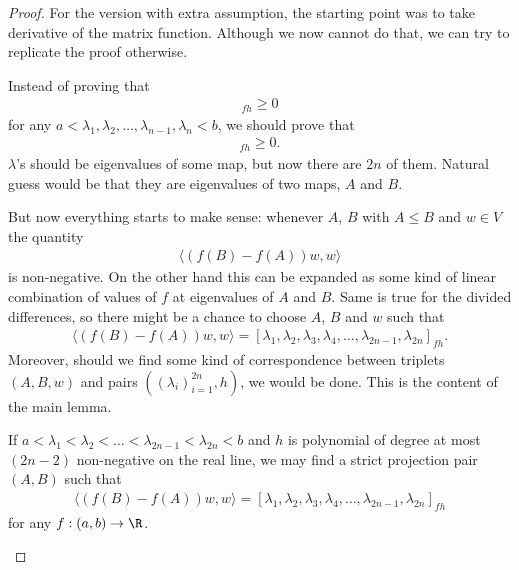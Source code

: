 \begin{proof}
	For the version with extra assumption, the starting point was to take derivative of the matrix function. Although we now cannot do that, we can try to replicate the proof otherwise.

	Instead of proving that
	\begin{align*}
		[\lambda_{1}, \lambda_{1}, \lambda_{2}, \lambda_{2}, \ldots, \lambda_{n}, \lambda_{n}]_{f h} \geq 0
	\end{align*}
	for any $a < \lambda_{1}, \lambda_{2}, \ldots, \lambda_{n - 1}, \lambda_{n} < b$, we should prove that
	\begin{align*}
		[\lambda_{1}, \lambda_{2}, \lambda_{3}, \lambda_{4}, \ldots, \lambda_{2n - 1}, \lambda_{2 n}]_{f h} \geq 0.
	\end{align*}
	$\lambda$'s should be eigenvalues of some map, but now there are $2 n$ of them. Natural guess would be that they are eigenvalues of two maps, $A$ and $B$.

	But now everything starts to make sense: whenever $A$, $B$ with $A \leq B$ and $w \in V$ the quantity
	\begin{align*}
		\langle (f(B) - f(A)) w, w \rangle
	\end{align*}
	is non-negative. On the other hand this can be expanded as some kind of linear combination of values of $f$ at eigenvalues of $A$ and $B$. Same is true for the divided differences, so there might be a chance to choose $A$, $B$ and $w$ such that
	\begin{align*}
		\langle (f(B) - f(A)) w, w \rangle = [\lambda_{1}, \lambda_{2}, \lambda_{3}, \lambda_{4}, \ldots, \lambda_{2n - 1}, \lambda_{2 n}]_{f h}.
	\end{align*}
	Moreover, should we find some kind of correspondence between triplets $(A, B, w)$ and pairs $((\lambda_{i})_{i = 1}^{2 n}, h)$, we would be done. This is the content of the main lemma.

	\begin{lem}\label{main_lemma}
		If $a < \lambda_{1} < \lambda_{2} < \ldots < \lambda_{2 n - 1} < \lambda_{2 n} < b$ and $h$ is polynomial of degree at most $(2 n - 2)$ non-negative on the real line, we may find a strict projection pair $(A, B)$ such that
		\begin{align*}
			\langle (f(B) - f(A)) w, w \rangle = [\lambda_{1}, \lambda_{2}, \lambda_{3}, \lambda_{4}, \ldots, \lambda_{2n - 1}, \lambda_{2 n}]_{f h}
		\end{align*}
		for any $f : (a, b) \to \R$.


\end{lem}
\end{proof}
